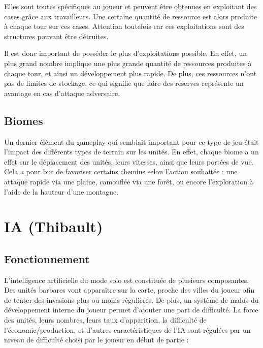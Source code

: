 \documentclass[12pt]{report}
\begin{document}
Elles sont toutes spécifiques au joueur et peuvent être obtenues en exploitant
des cases grâce aux travailleurs. Une certaine quantité de ressource est alors
produite à chaque tour sur ces cases. Attention toutefois car ces exploitations
sont des structures pouvant être détruites.

Il est donc important de posséder le plus d’exploitations possible. En effet, un
plus grand nombre implique une plus grande quantité de ressources produites à
chaque tour, et ainsi un développement plus rapide. De plus, ces ressources
n’ont pas de limites de stockage, ce qui signifie que faire des réserves
représente un avantage en cas d’attaque adversaire.

\subsection{Biomes}

Un dernier élément du gameplay qui semblait important pour ce type de jeu était
l’impact des différents types de terrain sur les unités. En effet, chaque biome
a un effet sur le déplacement des unités, leurs vitesses, ainsi que leurs
portées de vue. Cela a pour but de favoriser certains chemins selon l’action
souhaitée : une attaque rapide via une plaine, camouflée via une forêt, ou
encore l'exploration à l’aide de la hauteur d’une montagne.

\section{IA (Thibault)}

\subsection{Fonctionnement}

L’intelligence artificielle du mode solo est constituée de plusieurs
composantes. Des unités barbares vont apparaître sur la carte, proche des villes
du joueur afin de tenter des invasions plus ou moins régulières. De plus, un
système de malus du développement interne du joueur permet d’ajouter une part de
difficulté. La force des unités, leurs nombres, leurs taux d’apparition, la
difficulté de l’économie/production, et d’autres caractéristiques de l’IA sont
régulées par un niveau de difficulté choisi par le joueur en début de partie :
\end{document}
